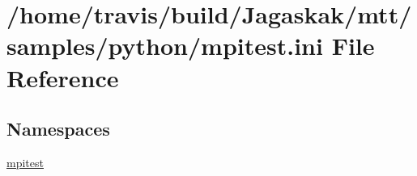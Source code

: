 \hypertarget{mpitest_8ini}{\section{/home/travis/build/\-Jagaskak/mtt/samples/python/mpitest.ini File Reference}
\label{mpitest_8ini}
}
\subsection*{Namespaces}
\begin{DoxyCompactItemize}
\item 
\hyperlink{namespacempitest}{mpitest}
\end{DoxyCompactItemize}
